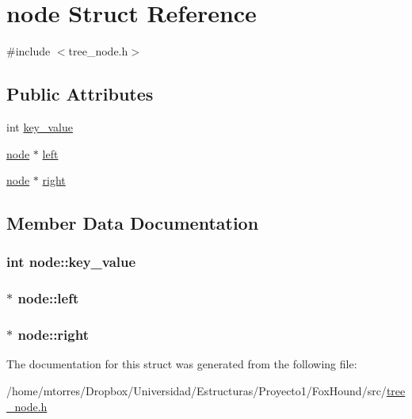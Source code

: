 \hypertarget{structnode}{\section{node Struct Reference}
\label{structnode}
}


{\ttfamily \#include $<$tree\-\_\-node.\-h$>$}

\subsection*{Public Attributes}
\begin{DoxyCompactItemize}
\item 
int \hyperlink{structnode_a182db137ea0884489bee856c63b33d9a}{key\-\_\-value}
\item 
\hyperlink{structnode}{node} $\ast$ \hyperlink{structnode_a7cbff55ff448f557223f79299056e9b1}{left}
\item 
\hyperlink{structnode}{node} $\ast$ \hyperlink{structnode_abdc86d4c8604c481752953af3235fc47}{right}
\end{DoxyCompactItemize}


\subsection{Member Data Documentation}
\hypertarget{structnode_a182db137ea0884489bee856c63b33d9a}{
\subsubsection[{key\-\_\-value}]{\setlength{\rightskip}{0pt plus 5cm}int node\-::key\-\_\-value}}\label{structnode_a182db137ea0884489bee856c63b33d9a}
\hypertarget{structnode_a7cbff55ff448f557223f79299056e9b1}{
\subsubsection[{left}]{$\ast$ node\-::left}}\label{structnode_a7cbff55ff448f557223f79299056e9b1}
\hypertarget{structnode_abdc86d4c8604c481752953af3235fc47}{
\subsubsection[{right}]{$\ast$ node\-::right}}\label{structnode_abdc86d4c8604c481752953af3235fc47}


The documentation for this struct was generated from the following file\-:\begin{DoxyCompactItemize}
\item 
/home/mtorres/\-Dropbox/\-Universidad/\-Estructuras/\-Proyecto1/\-Fox\-Hound/src/\hyperlink{tree__node_8h}{tree\-\_\-node.\-h}\end{DoxyCompactItemize}
